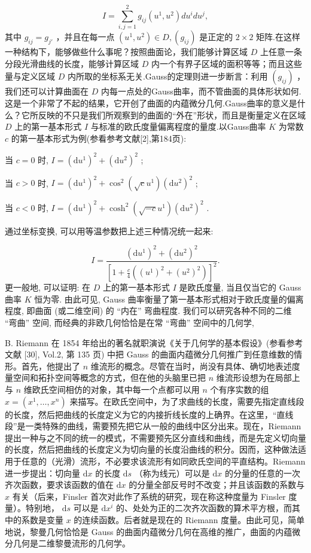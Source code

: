 $$
I = \sum_ {i, j = 1} ^ {2} g _ {i j} (u ^ {1}, u ^ {2}) d u ^ {i} d u ^ {j},
$$
其中  $g_{ij} = g_{j\prime}$  ，并且在每一点  $(u^{1},u^{2})\in D,(g_{ij})$  是正定的  $2\times 2$  矩阵.在这样一种结构下，能够做些什么事呢？按照曲面论，我们能够计算区域  $D$  上任意一条分段光滑曲线的长度，能够计算区域  $D$  内一个有界子区域的面积等等；而且这些量与定义区域  $D$  内所取的坐标系无关.Gauss的定理则进一步断言：利用  $(g_{ij})$  ，我们还可以计算曲面在  $D$  内每一点处的Gauss曲率，而不管曲面的具体形状如何.这是一个非常了不起的结果，它开创了曲面的内蕴微分几何.Gauss曲率的意义是什么？它所反映的不只是我们所观察到的曲面的“外在”形状，而且是衡量定义在区域  $D$  上的第一基本形式  $I$  与标准的欧氏度量偏离程度的量度.以Gauss曲率  $K$  为常数  $c$  的第一基本形式为例(参看参考文献[2],第184页):

当  $c = 0$  时,  $I = (\mathrm{d}u^{1})^{2} + (\mathrm{d}u^{2})^{2}$ ;

当  $c > 0$  时,  $I = (\mathrm{d}u^{1})^{2} + \cos^{2}(\sqrt{c} u^{1})(\mathrm{d}u^{2})^{2}$ ;

当  $c < 0$  时,  $I = (\mathrm{d}u^{1})^{2} + \cosh^{2}(\sqrt{-c} u^{1})(\mathrm{d}u^{2})^{2}$ .

通过坐标变换, 可以用等温参数把上述三种情况统一起来:

$$
I = \frac {(\mathrm {d} u ^ {1}) ^ {2} + (\mathrm {d} u ^ {2}) ^ {2}}{[ 1 + \frac {c}{4} ((u ^ {1}) ^ {2} + (u ^ {2}) ^ {2}) ] ^ {2}}.
$$
更一般地, 可以证明: 在  $D$  上的第一基本形式  $I$  是欧氏度量, 当且仅当它的 Gauss 曲率  $K$  恒为零. 由此可见, Gauss 曲率衡量了第一基本形式相对于欧氏度量的偏离程度, 即曲面 (或二维空间) 的 “内在” 弯曲程度. 我们可以研究各种不同的二维 “弯曲” 空间, 而经典的非欧几何恰恰是在常 “弯曲” 空间中的几何学,

B. Riemann 在 1854 年给出的著名就职演说《关于几何学的基本假设》(参看参考文献 [30], Vol.2, 第 135 页) 中把 Gauss 的曲面内蕴微分几何推广到任意维数的情形。首先，他提出了  $n$  维流形的概念。尽管在当时，尚没有具体、确切地表述度量空间和拓扑空间等概念的方式，但在他的头脑里已把  $n$  维流形设想为在局部上与  $n$  维欧氏空间相仿的对象，其中每一个点都可以用  $n$  个有序实数的组  $x = (x^{1}, \dots, x^{n})$  来描写。在欧氏空间中，为了求曲线的长度，需要先指定直线段的长度，然后把曲线的长度定义为它的内接折线长度的上确界。在这里，“直线段”是一类特殊的曲线，需要预先把它从一般的曲线中区分出来。现在，Riemann 提出一种与之不同的统一的模式，不需要预先区分直线和曲线，而是先定义切向量的长度，然后把曲线的长度定义为切向量的长度沿曲线的积分。因而，这种做法适用于任意的（光滑）流形，不必要求该流形有如同欧氏空间的平直结构。Riemann 进一步提出：切向量  $\mathrm{d}x$  的长度  $\mathrm{d}s$ （称为线元）可以是  $\mathrm{d}x$  的分量的任意的一次齐次函数，要求该函数的值在  $\mathrm{d}x$  的分量全部反号时不改变；并且该函数的系数与  $x$  有关（后来，Finsler 首次对此作了系统的研究，现在称这种度量为 Finsler 度量）。特别地， $\mathrm{d}s$  可以是  $\mathrm{d}x^{i}$  的、处处为正的二次齐次函数的算术平方根，而其中的系数是变量  $x$  的连续函数。后者就是现在的 Riemann 度量。由此可见，简单地说，黎曼几何恰恰是 Gauss 的曲面内蕴微分几何在高维的推广，曲面的内蕴微分几何是二维黎曼流形的几何学。

